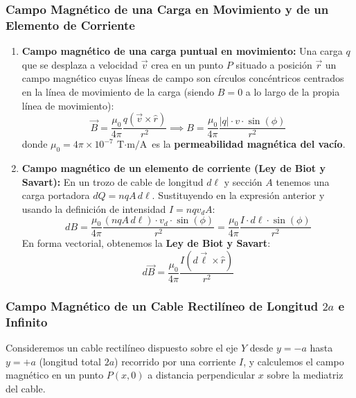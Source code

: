 \subsubsection{Campo Magnético de una Carga en Movimiento y de un Elemento de Corriente}
\begin{enumerate}[leftmargin=*]
    \item \textbf{Campo magnético de una carga puntual en movimiento:} Una carga $q$ que se desplaza a velocidad $\vec{v}$ crea en un punto $P$ situado a posición $\vec{r}$ un campo magnético cuyas líneas de campo son círculos concéntricos centrados en la línea de movimiento de la carga (siendo $B = 0$ a lo largo de la propia línea de movimiento):
    \begin{equation}
        \vec{B} = \frac{\mu_0}{4\pi} \frac{q (\vec{v} \times \hat{r})}{r^2} \implies B = \frac{\mu_0}{4\pi} \frac{|q| \cdot v \cdot \sin(\phi)}{r^2}
    \end{equation}
    donde $\mu_0 = 4\pi \times 10^{-7}\ \si{\tesla\cdot\meter\per\ampere}$ es la \textbf{permeabilidad magnética del vacío}.
    \item \textbf{Campo magnético de un elemento de corriente (Ley de Biot y Savart):} En un trozo de cable de longitud $d\ell$ y sección $A$ tenemos una carga portadora $dQ = n q A\, d\ell$. Sustituyendo en la expresión anterior y usando la definición de intensidad $I = n q v_d A$:
    \begin{equation}
        dB = \frac{\mu_0}{4\pi} \frac{(n q A\, d\ell) \cdot v_d \cdot \sin(\phi)}{r^2} = \frac{\mu_0}{4\pi} \frac{I \cdot d\ell \cdot \sin(\phi)}{r^2}
    \end{equation}
    En forma vectorial, obtenemos la \textbf{Ley de Biot y Savart}:
    \begin{equation}
        \boxed{d\vec{B} = \frac{\mu_0}{4\pi} \frac{I (d\vec{\ell} \times \hat{r})}{r^2}}
    \end{equation}
\end{enumerate}

\subsubsection{Campo Magnético de un Cable Rectilíneo de Longitud $2a$ e Infinito}
Consideremos un cable rectilíneo dispuesto sobre el eje $Y$ desde $y = -a$ hasta $y = +a$ (longitud total $2a$) recorrido por una corriente $I$, y calculemos el campo magnético en un punto $P(x, 0)$ a distancia perpendicular $x$ sobre la mediatriz del cable.

